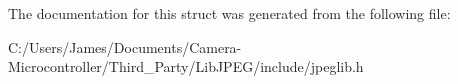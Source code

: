 The documentation for this struct was generated from the following file\+:\begin{DoxyCompactItemize}
\item 
C\+:/\+Users/\+James/\+Documents/\+Camera-\/\+Microcontroller/\+Third\+\_\+\+Party/\+Lib\+J\+P\+E\+G/include/jpeglib.\+h\end{DoxyCompactItemize}

